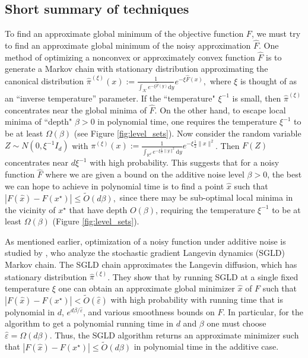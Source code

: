 \documentclass[final,12pt]{colt2018} %
\begin{document}
{ 
\subsection{Short summary of techniques}
%

To find an approximate global minimum of the objective function $F$, we must try to find an approximate global minimum of the noisy approximation $\hat{F}$. 
%
 One method of optimizing a nonconvex or approximately convex function $\hat{F}$ is to generate a Markov chain with stationary distribution approximating the canonical distribution $\hat{\pi}^{(\xi)}(x):= \frac{1}{\int_{\mathcal{K}}e^{-\xi \hat{F}(y)}\mathrm{d}y}e^{-\xi \hat{F}(x)},$ where $\xi$ is thought of as an ``inverse temperature'' parameter. 
  If the ``temperature" $\xi^{-1}$ is small, then $\hat{\pi}^{(\xi)}$ concentrates near the global minima of $\hat{F}$. 
   On the other hand, to escape local minima of ``depth" $\beta>0$ in polynomial time, one requires the temperature $\xi^{-1}$ to be at least $\Omega(\beta)$ (see Figure \ref{fig:level_sets}). 
    Now consider the random variable $Z \sim N(0, \xi^{-1} I_d)$ with $\pi^{(\xi)}(x):= \frac{1}{\int_{\mathbb{R}^d}e^{-\xi \frac{1}{2} \|y\|^2}\mathrm{d}y}e^{-\xi \frac{1}{2} \|x\|^2}$.
     Then  $F(Z)$ concentrates near $d\xi^{-1}$ with high probability. 
      This suggests that for a noisy function $\hat{F}$ where we are given a bound on the additive noise  level $\beta>0$, the best we can hope to achieve in polynomial time is to find a point $\hat{x}$ such that $|F(\hat{x}) - F(x^\star)| \leq \tilde{O}(d\beta),$ since there may be sub-optimal local minima in the vicinity of $x^\star$ that have depth $O(\beta)$, requiring the temperature $\xi^{-1}$ to be at least $\Omega(\beta)$ (Figure \ref{fig:level_sets}).


As mentioned earlier, optimization of a noisy function under additive noise is studied by \cite{hitting_times}, who analyze the stochastic gradient Langevin dynamics (SGLD) Markov chain. 
%
 The SGLD chain approximates the Langevin diffusion, which has stationary distribution $\hat{\pi}^{(\xi)}$.  
 They show that by running SGLD at a single fixed temperature $\xi$ one can obtain an approximate global minimizer $\hat{x}$ of $F$ such that  $|F(\hat{x}) - F(x^\star)| < \tilde{O}(\hat{\varepsilon})$ with high probability with running time that is polynomial in $d$, $e^{d\beta/\hat{\varepsilon}}$, and various smoothness bounds on $F$.
   In particular, for the algorithm to get a polynomial running time in $d$ and $\beta$ one must choose $\hat{\varepsilon} = \Omega(d \beta)$.  
   Thus, the SGLD algorithm returns an approximate minimizer such that $|F(\hat{x}) - F(x^\star)| \leq \tilde{O}(d\beta)$ in polynomial time in the additive case.



}
\end{document}
